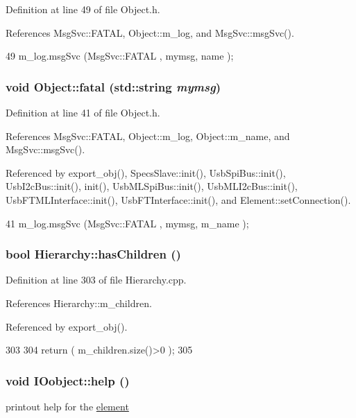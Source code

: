 Definition at line 49 of file Object.h.

References MsgSvc::FATAL, Object::m\_\-log, and MsgSvc::msgSvc().


\begin{DoxyCode}
49 { m_log.msgSvc (MsgSvc::FATAL   , mymsg, name ); }
\end{DoxyCode}
\hypertarget{classObject_aad5a16aac7516ce65bd5ec02ab07fc80}{
\subsubsection[{fatal}]{\setlength{\rightskip}{0pt plus 5cm}void Object::fatal (std::string {\em mymsg})}}
\label{classObject_aad5a16aac7516ce65bd5ec02ab07fc80}


Definition at line 41 of file Object.h.

References MsgSvc::FATAL, Object::m\_\-log, Object::m\_\-name, and MsgSvc::msgSvc().

Referenced by export\_\-obj(), SpecsSlave::init(), UsbSpiBus::init(), UsbI2cBus::init(), init(), UsbMLSpiBus::init(), UsbMLI2cBus::init(), UsbFTMLInterface::init(), UsbFTInterface::init(), and Element::setConnection().


\begin{DoxyCode}
41 { m_log.msgSvc (MsgSvc::FATAL   , mymsg, m_name ); }
\end{DoxyCode}
\hypertarget{classHierarchy_a255174fe4d316d2a3f430dcb9dab29f1}{
\subsubsection[{hasChildren}]{\setlength{\rightskip}{0pt plus 5cm}bool Hierarchy::hasChildren ()}}
\label{classHierarchy_a255174fe4d316d2a3f430dcb9dab29f1}


Definition at line 303 of file Hierarchy.cpp.

References Hierarchy::m\_\-children.

Referenced by export\_\-obj().


\begin{DoxyCode}
303                               {
304   return ( m_children.size()>0 );
305 }
\end{DoxyCode}
\hypertarget{classIOobject_a0520d82a9773c764fbaede59fe6f8a17}{
\subsubsection[{help}]{\setlength{\rightskip}{0pt plus 5cm}void IOobject::help ()}}
\label{classIOobject_a0520d82a9773c764fbaede59fe6f8a17}
printout help for the \hyperlink{namespaceelement}{element} 

